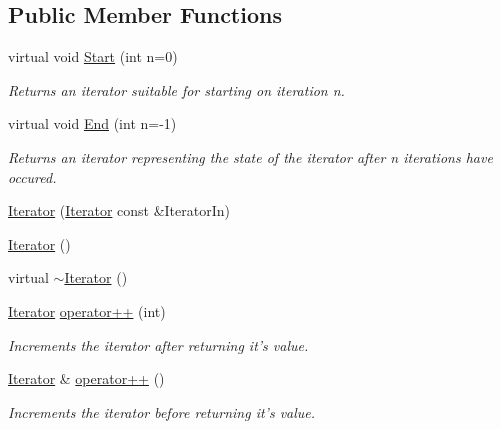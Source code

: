 \subsection*{Public Member Functions}
\begin{DoxyCompactItemize}
\item 
virtual void \hyperlink{classJKBuilder_1_1Iterator_a34ca36a99b20ae3170babadaffe51ed2}{Start} (int n=0)
\begin{DoxyCompactList}\small\item\em Returns an iterator suitable for starting on iteration n. \item\end{DoxyCompactList}\item 
virtual void \hyperlink{classJKBuilder_1_1Iterator_a5f692b73d2e160450f4617bb75825e11}{End} (int n=-\/1)
\begin{DoxyCompactList}\small\item\em Returns an iterator representing the state of the iterator after n iterations have occured. \item\end{DoxyCompactList}\item 
\hyperlink{classJKBuilder_1_1Iterator_a73347fde83464fe47afb15d2e34d86ad}{Iterator} (\hyperlink{classJKBuilder_1_1Iterator}{Iterator} const \&IteratorIn)
\item 
\hyperlink{classJKBuilder_1_1Iterator_a1f703720e1f5d97a0386c2dfe803c763}{Iterator} ()
\item 
virtual \hyperlink{classJKBuilder_1_1Iterator_a844b82815a73859e781b4798eb82f221}{$\sim$Iterator} ()
\item 
\hyperlink{classJKBuilder_1_1Iterator}{Iterator} \hyperlink{classJKBuilder_1_1Iterator_ac1702aedba13b4112b891b58dfd78eba}{operator++} (int)
\begin{DoxyCompactList}\small\item\em Increments the iterator after returning it's value. \item\end{DoxyCompactList}\item 
\hyperlink{classJKBuilder_1_1Iterator}{Iterator} \& \hyperlink{classJKBuilder_1_1Iterator_ae1f21c74128a5ef5d1b9de72ceb09be8}{operator++} ()
\begin{DoxyCompactList}\small\item\em Increments the iterator before returning it's value. \item\end{DoxyCompactList}\item 

\end{DoxyCompactItemize}
